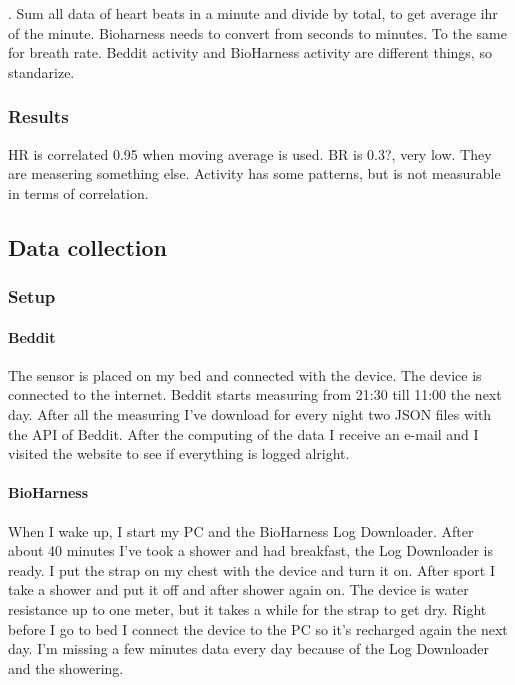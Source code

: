 			. Sum all data of heart beats in a minute and divide by total, to get average ihr of the minute. 
			Bioharness needs to convert from seconds to minutes. To the same for breath rate. 
			Beddit activity and BioHarness activity are different things, so standarize.

		\subsubsection{Results}
			HR is correlated 0.95 when moving average is used.
			BR is 0.3?, very low. They are measering something else.
			Activity has some patterns, but is not measurable in terms of correlation.



	\subsection{Data collection}
		\subsubsection{Setup}
			\paragraph{Beddit}
				The sensor is placed on my bed and connected with the device. The device is connected to the internet. Beddit starts measuring from 21:30 till 11:00 the next day. After all the measuring I've download for every night two JSON files with the API of Beddit\cite{bedditapi}. After the computing of the data I receive an e-mail and I visited the website to see if everything is logged alright.
			\paragraph{BioHarness}
				When I wake up, I start my PC and the BioHarness Log Downloader. After about 40 minutes I've took a shower and had breakfast, the Log Downloader is ready. I put the strap on my chest with the device and turn it on. After sport I take a shower and put it off and after shower again on. The device is water resistance up to one meter, but it takes a while for the strap to get dry. Right before I go to bed I connect the device to the PC so it's recharged again the next day. I'm missing a few minutes data every day because of the Log Downloader and the showering. 
